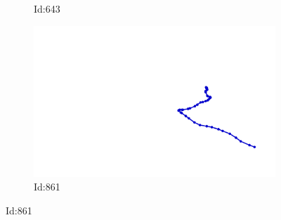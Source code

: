 \documentclass[12pt,twoside]{report}
\begin{document}
\begin{figure}
\begin{subfigure}[b]{0.20\textwidth}
\caption{Id:643}
\end{subfigure}
\begin{subfigure}[b]{0.20\textwidth}
\centering
\includegraphics[width=\textwidth]{../../trajectories/861.png}
\caption{Id:861}
\end{subfigure}
\end{figure}
\end{document}
